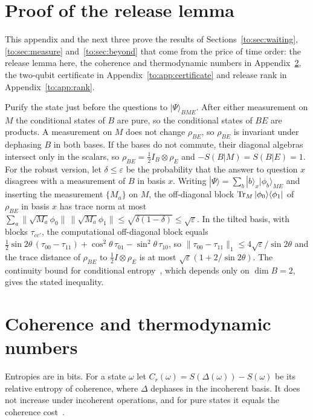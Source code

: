 \section{Proof of the release lemma}\label{to:app:release}\label{app:order-proofs}

This appendix and the next three prove the results of Sections~\ref{to:sec:waiting}, \ref{to:sec:measure} and~\ref{to:sec:beyond} that come from the price of time order: the release lemma here, the coherence and thermodynamic numbers in Appendix~\ref{to:app:numbers}, the two-qubit certificate in Appendix~\ref{to:app:certificate} and release rank in Appendix~\ref{to:app:rank}.

Purify the state just before the questions to $|\Psi\rangle_{BME}$. After either measurement on $M$ the conditional states of $B$ are pure, so the conditional states of $BE$ are products. A measurement on $M$ does not change $\rho_{BE}$, so $\rho_{BE}$ is invariant under dephasing $B$ in both bases. If the bases do not commute, their diagonal algebras intersect only in the scalars, so $\rho_{BE}=\tfrac12I_B\otimes\rho_E$ and $-S(B|M)=S(B|E)=1$. For the robust version, let $\delta\le\varepsilon$ be the probability that the answer to question $x$ disagrees with a measurement of $B$ in basis $x$. Writing $|\Psi\rangle=\sum_b|b\rangle_x|\phi_b\rangle_{ME}$ and inserting the measurement $\{M_a\}$ on $M$, the off-diagonal block $\operatorname{Tr}_M|\phi_0\rangle\langle\phi_1|$ of $\rho_{BE}$ in basis $x$ has trace norm at most $\sum_a\|\sqrt{M_a}\phi_0\|\,\|\sqrt{M_a}\phi_1\|\le\sqrt{\delta(1-\delta)}\le\sqrt\varepsilon$. In the tilted basis, with blocks $\tau_{cc'}$, the computational off-diagonal block equals $\tfrac12\sin2\theta\,(\tau_{00}-\tau_{11})+\cos^2\theta\,\tau_{01}-\sin^2\theta\,\tau_{10}$, so $\|\tau_{00}-\tau_{11}\|_1\le4\sqrt\varepsilon/\sin2\theta$ and the trace distance of $\rho_{BE}$ to $\tfrac12I\otimes\rho_E$ is at most $\sqrt\varepsilon(1+2/\sin2\theta)$. The continuity bound for conditional entropy~\cite{Winter16}, which depends only on $\dim B=2$, gives the stated inequality.

\section{Coherence and thermodynamic numbers}\label{to:app:numbers}

Entropies are in bits. For a state $\omega$ let $C_r(\omega)=S(\Delta(\omega))-S(\omega)$ be its relative entropy of coherence, where $\Delta$ dephases in the incoherent basis. It does not increase under incoherent operations, and for pure states it equals the coherence cost~\cite{BCP14,WinterYang16}.

